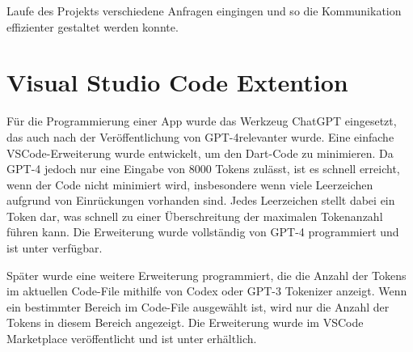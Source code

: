 Laufe des Projekts verschiedene Anfragen eingingen und so
die Kommunikation effizienter gestaltet werden konnte.


\section{Visual Studio Code Extention}

Für die Programmierung einer App wurde das Werkzeug ChatGPT
eingesetzt, das auch nach der Veröffentlichung von
GPT-4relevanter wurde.  Eine einfache VSCode-Erweiterung
wurde entwickelt, um den Dart-Code zu minimieren. Da GPT-4
jedoch nur eine Eingabe von 8000 Tokens zulässt, ist es
schnell erreicht, wenn der Code nicht minimiert wird,
insbesondere wenn viele Leerzeichen aufgrund von
Einrückungen vorhanden sind. Jedes Leerzeichen stellt dabei
ein Token dar, was schnell zu einer Überschreitung der
maximalen Tokenanzahl führen kann. Die Erweiterung wurde
vollständig von GPT-4 programmiert und ist unter
\cite{copyminify} verfügbar.

Später wurde eine weitere Erweiterung programmiert, die die Anzahl der Tokens im aktuellen Code-File mithilfe von Codex oder GPT-3 Tokenizer anzeigt. Wenn ein bestimmter Bereich im Code-File ausgewählt ist, wird nur die Anzahl der Tokens in diesem Bereich angezeigt. Die Erweiterung wurde im VSCode Marketplace veröffentlicht und ist unter \cite{tokenizer} erhältlich.


